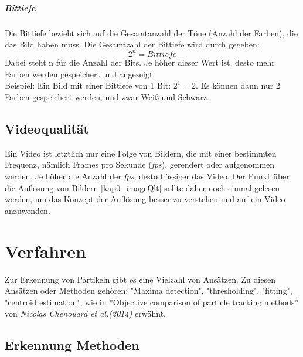 \subparagraph{Bittiefe\\}
Die Bittiefe bezieht sich auf die Gesamtanzahl der Töne (Anzahl der Farben), die das Bild haben muss.  Die Gesamtzahl der Bittiefe wird durch gegeben:
\begin{equation}
	2^n = Bittiefe
\end{equation}   Dabei steht n für die Anzahl der Bits.
Je höher dieser Wert ist, desto mehr Farben werden gespeichert und angezeigt.\\ Beispiel: Ein Bild mit einer Bittiefe von 1 Bit: $2^1=2$. Es können dann nur 2 Farben gespeichert werden, und zwar Weiß und Schwarz.

\subsection{Videoqualität \label{kap0_videoQlt}}

Ein Video ist letztlich nur eine Folge von Bildern, die mit einer bestimmten Frequenz, nämlich Frames pro Sekunde (\textit{fps}), gerendert oder aufgenommen werden.
Je höher die Anzahl der \textit{fps}, desto flüssiger das Video.
Der Punkt über die Auflösung von Bildern \ref{kap0_imageQlt} sollte daher noch einmal gelesen werden, um das Konzept der Auflösung besser zu verstehen und auf ein Video anzuwenden.

\section{Verfahren  \label{kap0_verf}}
Zur Erkennung von Partikeln gibt es eine Vielzahl von Ansätzen. Zu diesen Ansätzen oder Methoden gehören: "Maxima detection", "thresholding", "fitting", "centroid estimation", wie in ''Objective comparison of particle tracking methods'' von  \textit{Nicolas Chenouard et al.(2014)}  \cite{chenouard2014objective}  erwähnt.
\subsection{Erkennung Methoden \label{kap0_verf_erkenn}}


